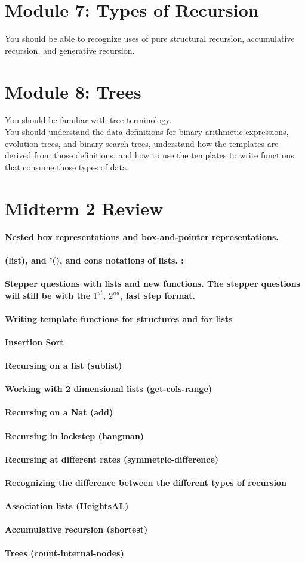 \documentclass[12pt,letter]{article}
\begin{document}
\section*{Module 7: Types of Recursion}
You should be able to recognize uses of pure structural recursion,
accumulative recursion, and generative recursion.

\section*{Module 8: Trees}
You should be familiar with tree terminology. \\ 
You should understand the data definitions for binary arithmetic
expressions, evolution trees, and binary search trees, understand
how the templates are derived from those definitions, and how to use
the templates to write functions that consume those types of data.\\ 



\section*{Midterm 2 Review}
\textbf{Nested box representations and box-and-pointer representations.}\\ \\ 
\textbf{(list), and '(), and cons notations of lists. :}\\ \\ 
\textbf{Stepper questions with lists and new functions. The stepper questions will still be with the $1^{st}$, $2^{nd}$, last step format.}\\ \\ 
\textbf{Writing template functions for structures and for lists}\\ \\
\textbf{Insertion Sort}\\ \\ 
\textbf{Recursing on a list (sublist)}\\ \\ 
\textbf{Working with 2 dimensional lists (get-cols-range)}\\ \\ 
\textbf{Recursing on a Nat (add)}\\ \\ 
\textbf{Recursing in lockstep (hangman)}\\ \\ 
\textbf{Recursing at different rates (symmetric-difference)}\\ \\ 
\textbf{Recognizing the difference between the different types of recursion}\\ \\
\textbf{Association lists (HeightsAL)}\\ \\ 
\textbf{Accumulative recursion (shortest)}\\ \\ 
\textbf{Trees (count-internal-nodes)}
\end{document}
